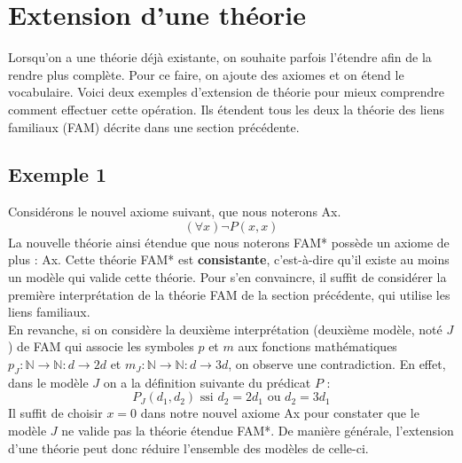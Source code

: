 \section{Extension d'une théorie}
Lorsqu'on a une théorie déjà existante, on souhaite parfois l'étendre afin de la rendre plus complète. Pour ce faire, on ajoute des axiomes et on étend le vocabulaire. Voici deux exemples d'extension de théorie pour mieux comprendre comment effectuer cette opération. Ils étendent tous les deux la théorie des liens familiaux (FAM) décrite dans une section précédente.

\subsection*{Exemple 1}
Considérons le nouvel axiome suivant, que nous noterons Ax.
$$ (\forall x) \neg P(x,x) $$
La nouvelle théorie ainsi étendue que nous noterons FAM* possède un axiome de plus : Ax. Cette théorie FAM* est \textbf{consistante}, c'est-à-dire qu'il existe au moins un modèle qui valide cette théorie. Pour s'en convaincre, il suffit de considérer la première interprétation de la théorie FAM de la section précédente, qui utilise les liens familiaux. \\

En revanche, si on considère la deuxième interprétation (deuxième modèle, noté $J$) de FAM qui associe les symboles $p$ et $m$ aux fonctions mathématiques $p_J : \mathbb{N} \rightarrow \mathbb{N} : d \rightarrow 2d$ et $m_J : \mathbb{N} \rightarrow \mathbb{N} : d \rightarrow 3d$, on observe une contradiction. En effet, dans le modèle $J$ on a la définition suivante du prédicat $P$ :
$$ P_J(d_1, d_2) \textrm{ ssi } d_2 = 2d_1 \textrm{ ou } d_2 = 3d_1$$
Il suffit de choisir $x=0$ dans notre nouvel axiome Ax pour constater que le modèle $J$ ne valide pas la théorie étendue FAM*. De manière générale, l'extension d'une théorie peut donc réduire l'ensemble des modèles de celle-ci.

